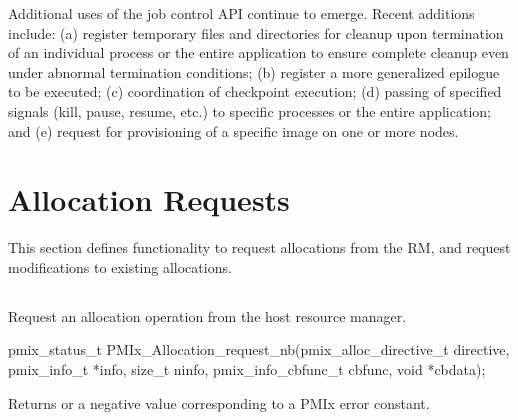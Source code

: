 Additional uses of the job control API continue to emerge. Recent additions include: (a) register temporary files and directories for cleanup upon termination of an individual process or the entire application to ensure complete cleanup even under abnormal termination conditions; (b) register a more generalized epilogue to be executed; (c) coordination of checkpoint execution; (d) passing of specified signals (kill, pause, resume, etc.) to specific processes or the entire application; and (e) request for provisioning of a specific image on one or more nodes.


\section{Allocation Requests}
\label{chap:api_job_mgmt:alloc}

This section defines functionality to request allocations from the \ac{RM}, and request modifications to existing allocations. 

\subsection{}

\summary

Request an allocation operation from the host resource manager.

\format

\cspecificstart
\begin{codepar}
pmix_status_t
PMIx_Allocation_request_nb(pmix_alloc_directive_t directive,
                           pmix_info_t *info, size_t ninfo,
                           pmix_info_cbfunc_t cbfunc, void *cbdata);
\end{codepar}
\cspecificend

\begin{arglist}
\end{arglist}

Returns  or a negative value corresponding to a PMIx error constant.

